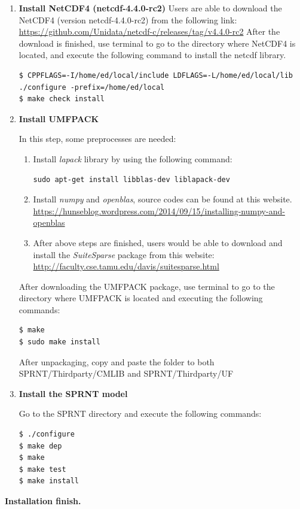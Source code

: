 \documentclass[12pt, letterpaper]{article}
\newcommand{\mybox}{%
    \collectbox{%
        \setlength{\fboxsep}{1pt}%
        \fbox{\BOXCONTENT}%
    }%
}
\begin{document}
\begin{enumerate}
\item \textbf{Install NetCDF4 (netcdf-4.4.0-rc2)} \newline
Users are able to download the NetCDF4 (version netcdf-4.4.0-rc2) from the following link:\newline
\url{https://github.com/Unidata/netcdf-c/releases/tag/v4.4.0-rc2}\newline
After the download is finished, use terminal to go to the directory where NetCDF4 is located, and execute the following command to install the netcdf library.
\begin{lstlisting}[frame=single,basicstyle=\footnotesize]
$ CPPFLAGS=-I/home/ed/local/include LDFLAGS=-L/home/ed/local/lib 
./configure -prefix=/home/ed/local
$ make check install
\end{lstlisting}


\item \textbf{Install UMFPACK}

In this step, some preprocesses are needed:
\begin{enumerate}
\item Install \emph{lapack} library by using the following command:
\begin{lstlisting}[frame=single]
sudo apt-get install libblas-dev liblapack-dev
\end{lstlisting}

\item Install \emph{numpy} and \emph{openblas}, source codes can be found at this website. \\
\url{https://hunseblog.wordpress.com/2014/09/15/installing-numpy-and-openblas}

\item After above steps are finished, users would be able to download and install the \emph{SuiteSparse} package from this website:\\
\url{http://faculty.cse.tamu.edu/davis/suitesparse.html}
\end{enumerate}
After downloading the UMFPACK package, use terminal to go to the directory where UMFPACK is located and executing the following commands:
\begin{lstlisting}[frame=single]
$ make 
$ sudo make install
\end{lstlisting}
After unpackaging, copy and paste the folder to both \mybox{SPRNT/Thirdparty/CMLIB} and \mybox{SPRNT/Thirdparty/UF}

\item \textbf{Install the SPRNT model}

Go to the SPRNT directory and execute the following commands:
\begin{lstlisting}[frame=single]
$ ./configure
$ make dep
$ make
$ make test
$ make install
\end{lstlisting}
\end{enumerate}
\centering
\textbf{Installation finish.}
\end{document}
